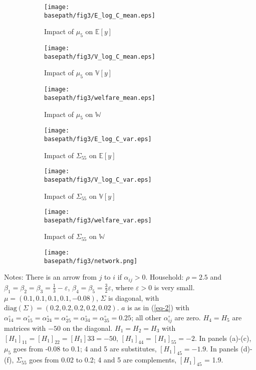 \documentclass[11pt]{article}
\theoremstyle{definition}
\newcommand{\basepath}{F:/12004835/replication_package_final/replication_package_final/output_figures}
\begin{document}
	\begin{figure}[ht]
		\caption{The non-monotone impact of beliefs on GDP}
		\centering
		\begin{subfigure}[b]{0.32\textwidth} 
			\caption{Impact of $\mu_5$ on $\mathbb{E}[y]$}
			\texttt{[image: \\basepath/fig3/E\_log\_C\_mean.eps]}
			\label{fig:3-a}
		\end{subfigure}
		\hfill
		\begin{subfigure}[b]{0.32\textwidth}
			\caption{Impact of $\mu_5$ on $\mathbb{V}[y]$}
			\texttt{[image: \\basepath/fig3/V\_log\_C\_mean.eps]}
			\label{fig:3-b}
		\end{subfigure}
		\hfill
		\begin{subfigure}[b]{0.32\textwidth}
			\caption{Impact of $\mu_5$ on $\mathbb{W}$}
			\texttt{[image: \\basepath/fig3/welfare\_mean.eps]}
			\label{fig:3-c}
		\end{subfigure}
		
		\begin{subfigure}[b]{0.32\textwidth} 
			\caption{Impact of $\Sigma_{55}$ on $\mathbb{E}[y]$}
			\texttt{[image: \\basepath/fig3/E\_log\_C\_var.eps]}
			\label{fig:3-d}
		\end{subfigure}
		\hfill
		\begin{subfigure}[b]{0.32\textwidth}
			\caption{Impact of $\Sigma_{55}$ on $\mathbb{V}[y]$}
			\texttt{[image: \\basepath/fig3/V\_log\_C\_var.eps]}
			\label{fig:3-e}
		\end{subfigure}
		\hfill
		\begin{subfigure}[b]{0.32\textwidth}
			\caption{Impact of $\Sigma_{55}$ on $\mathbb{W}$}
			\texttt{[image: \\basepath/fig3/welfare\_var.eps]}
			\label{fig:3-f}
		\end{subfigure}
		
		\begin{subfigure}[b]{0.5\textwidth}
			\texttt{[image: \\basepath/fig3/network.png]}
			\label{fig:3-g}
		\end{subfigure}
		\label{fig:3}
	\end{figure}
	
	Notes: There is an arrow from $j$ to $i$ if $\alpha_{ij} > 0$. Household: $\rho = 2.5$ and $\beta_1 = \beta_2 = \beta_3 = \frac{1}{3} - \varepsilon$, $\beta_4 = \beta_5 = \frac{3}{2}\varepsilon$, where
	$\varepsilon > 0$ is very small. $\mu = (0.1, 0.1, 0.1, 0.1, -0.08)$, $\Sigma$ is diagonal, with $\text{diag}(\Sigma) = (0.2, 0.2, 0.2, 0.2, 0.02)$. $a$ is as in (\ref{eq-2}) with $\alpha^{\circ}_{14} = \alpha^{\circ}_{15} = \alpha^{\circ}_{24} = \alpha^{\circ}_{25} = \alpha^{\circ}_{34} = \alpha^{\circ}_{35} = 0.25$; all other $\alpha^{\circ}_{ij}$ are zero. $H_4 = H_5$ are matrices with $-50$ on the diagonal. $H_1 = H_2 = H_3$ with $[H_1]_{11} = [H_1]_{22} = [H_1]{33} = -50$, $[H_1]_{44} = [H_1]_{55} = -2$. In panels (a)-(c), $\mu_5$ goes from -0.08 to 0.1; 4 and 5 are substitutes, $[H_1]_{45} = -1.9$. In panels (d)-(f), $\Sigma_{55}$ goes from 0.02 to 0.2; 4 and 5 are complements, $[H_1]_{45}$ = 1.9.
	
\end{document}
